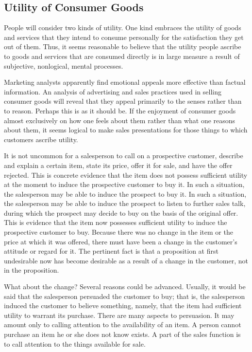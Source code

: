 \subsection{Utility of Consumer Goods}

People will consider two kinds of utility. One kind embraces the utility of goods and services that they intend to consume personally for the satisfaction they get out of them. Thus, it seems reasonable to believe that the utility people ascribe to goods and services that are consumed directly is in large measure a result of subjective, nonlogical, mental processes.

Marketing analysts apparently find emotional appeals more effective than factual information. An analysis of advertising and sales practices used in selling consumer goods will reveal that they appeal primarily to the senses rather than to reason. Perhaps this is as it should be. If the enjoyment of consumer goods almost exclusively on how one feels about them rather than what one reasons about them, it seems logical to make sales presentations for those things to which customers ascribe utility.

It is not uncommon for a salesperson to call on a prospective customer, describe and explain a certain item, state its price, offer it for sale, and have the offer rejected. This is concrete evidence that the item does not possess sufficient utility at the moment to induce the prospective customer to buy it. In such a situation, the salesperson may be able to induce the prospect to buy it. In such a situation, the salesperson may be able to induce the prospect to listen to further sales talk, during which the prospect may decide to buy on the basis of the original offer. This is evidence that the item now possesses sufficient utility to induce the prospective customer to buy. Because there was no change in the item or the price at which it was offered, there must have been a change in the customer’s attitude or regard for it. The pertinent fact is that a proposition at first undesirable now has become desirable as a result of a change in the customer, not in the proposition.

What about the change?  Several reasons could be advanced. Usually, it would be said that the salesperson persuaded the customer to buy; that is, the salesperson induced the customer to believe something, namely, that the item had sufficient utility to warrant its purchase. There are many aspects to persuasion. It may amount only to calling attention to the availability of an item. A person cannot purchase an item he or she does not know exists. A part of the sales function is to call attention to the things available for sale.

